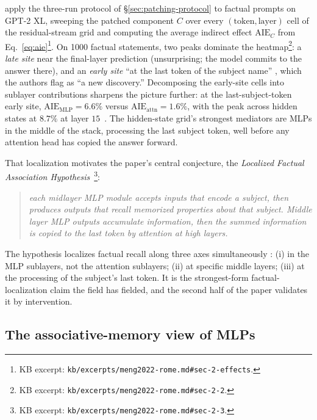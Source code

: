 \citet{meng2022-rome} apply the three-run protocol of
\S\ref{sec:patching-protocol} to factual prompts on GPT-2 XL,
sweeping the patched component $C$ over every $(\text{token}, \text{layer})$
cell of the residual-stream grid and computing the average indirect
effect $\mathrm{AIE}_C$ from
Eq.~\eqref{eq:aie}\footnote{KB excerpt:
\nolinkurl{kb/excerpts/meng2022-rome.md#sec-2-effects}.}. On 1000 factual
statements, two peaks dominate the
heatmap\footnote{KB excerpt:
\nolinkurl{kb/excerpts/meng2022-rome.md#sec-2-2}.}: a \emph{late site}
near the final-layer prediction (unsurprising; the model commits to
the answer there), and an \emph{early site} ``at the last token of
the subject name'' \citep[\S 2.2]{meng2022-rome}, which the authors
flag as ``a new discovery.'' Decomposing the early-site cells into
sublayer contributions sharpens the picture further: at the
last-subject-token early site, $\mathrm{AIE}_{\mathrm{MLP}} = 6.6\%$
versus $\mathrm{AIE}_{\mathrm{attn}} = 1.6\%$, with the  peak
across hidden states at $8.7\%$ at layer
$15$~\citep[\S 2.2]{meng2022-rome}. The hidden-state grid's strongest
mediators are MLPs in the middle of the stack, processing the last
subject token, well before any attention head has copied the answer
forward.

That localization motivates the paper's central conjecture, the
\emph{Localized Factual Association Hypothesis}~\citep[\S
2.3]{meng2022-rome}\footnote{KB excerpt:
\nolinkurl{kb/excerpts/meng2022-rome.md#sec-2-3}.}:

\begin{quote}
\itshape
each midlayer MLP module accepts inputs that encode a subject, then
produces outputs that recall memorized properties about that subject.
Middle layer MLP outputs accumulate information, then the summed
information is copied to the last token by attention at high layers.
\end{quote}

\noindent
The hypothesis localizes factual recall along three axes simultaneously
\citep[\S 2.3]{meng2022-rome}: (i) in the MLP sublayers, not the
attention sublayers; (ii) at specific middle layers; (iii) at the
processing of the subject's last token. It is the strongest-form
factual-localization claim the field has fielded, and the second half
of the paper validates it by intervention.

\subsection{The associative-memory view of MLPs}
\label{sec:rome-memory}

